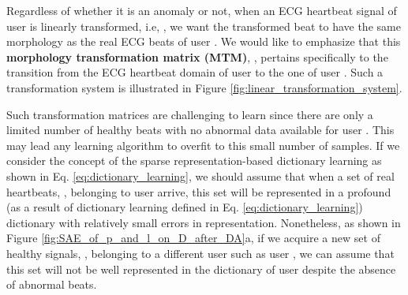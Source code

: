 \documentclass[journal,transmag]{IEEEtran}
\begin{document}
Regardless of whether it is an anomaly or not, when an ECG heartbeat signal  of user  is linearly transformed, i.e, , we want the transformed beat  to have the same morphology as the real ECG beats of user . We would like to emphasize that this \textbf{morphology transformation matrix (MTM)}, , pertains specifically to the transition from the ECG heartbeat domain of user  to the one of user . Such a transformation system is illustrated in Figure \ref{fig:linear_transformation_system}.

Such transformation matrices are challenging to learn since there are only a limited number of healthy beats with no abnormal data available for user . This may lead any learning algorithm to overfit to this small number of samples. If we consider the concept of the sparse representation-based dictionary learning as shown in Eq. \eqref{eq:dictionary_learning}, we should assume that when a set of real heartbeats, , belonging to user  arrive, this set will be represented in a profound (as a result of dictionary learning defined in Eq. \eqref{eq:dictionary_learning}) dictionary  with relatively small errors in representation. Nonetheless, as shown in Figure \ref{fig:SAE_of_p_and_l_on_D_after_DA}a, if we acquire a new set of healthy signals, , belonging to a different user such as user , we can assume that this set will not be well represented in the dictionary of user  despite the absence of abnormal beats.
\end{document}
